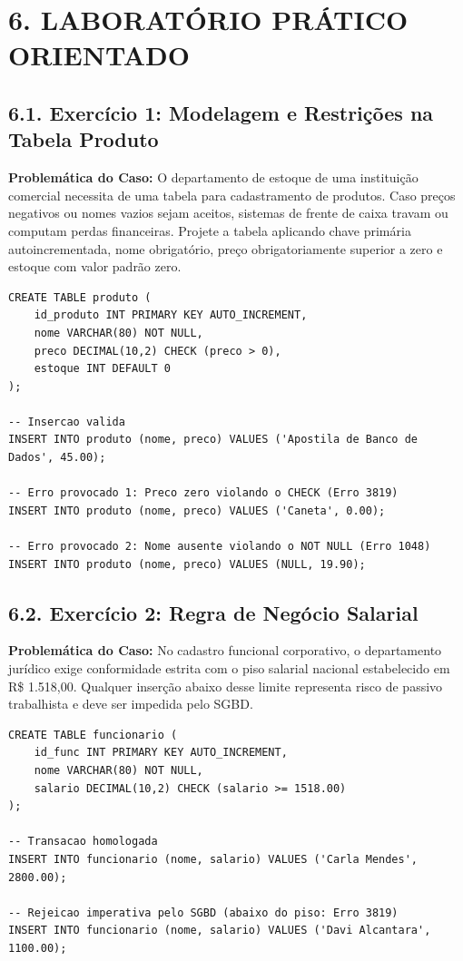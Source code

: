 \newpage

\section*{6. LABORATÓRIO PRÁTICO ORIENTADO}

\subsection*{6.1. Exercício 1: Modelagem e Restrições na Tabela Produto}

\textbf{Problemática do Caso:} O departamento de estoque de uma instituição comercial necessita de uma tabela para cadastramento de produtos. Caso preços negativos ou nomes vazios sejam aceitos, sistemas de frente de caixa travam ou computam perdas financeiras. Projete a tabela aplicando chave primária autoincrementada, nome obrigatório, preço obrigatoriamente superior a zero e estoque com valor padrão zero.

\begin{lstlisting}
CREATE TABLE produto (
    id_produto INT PRIMARY KEY AUTO_INCREMENT,
    nome VARCHAR(80) NOT NULL,
    preco DECIMAL(10,2) CHECK (preco > 0),
    estoque INT DEFAULT 0
);

-- Insercao valida
INSERT INTO produto (nome, preco) VALUES ('Apostila de Banco de Dados', 45.00);

-- Erro provocado 1: Preco zero violando o CHECK (Erro 3819)
INSERT INTO produto (nome, preco) VALUES ('Caneta', 0.00);

-- Erro provocado 2: Nome ausente violando o NOT NULL (Erro 1048)
INSERT INTO produto (nome, preco) VALUES (NULL, 19.90);
\end{lstlisting}

\subsection*{6.2. Exercício 2: Regra de Negócio Salarial}

\textbf{Problemática do Caso:} No cadastro funcional corporativo, o departamento jurídico exige conformidade estrita com o piso salarial nacional estabelecido em R\$ 1.518,00. Qualquer inserção abaixo desse limite representa risco de passivo trabalhista e deve ser impedida pelo SGBD.

\begin{lstlisting}
CREATE TABLE funcionario (
    id_func INT PRIMARY KEY AUTO_INCREMENT,
    nome VARCHAR(80) NOT NULL,
    salario DECIMAL(10,2) CHECK (salario >= 1518.00)
);

-- Transacao homologada
INSERT INTO funcionario (nome, salario) VALUES ('Carla Mendes', 2800.00);

-- Rejeicao imperativa pelo SGBD (abaixo do piso: Erro 3819)
INSERT INTO funcionario (nome, salario) VALUES ('Davi Alcantara', 1100.00);
\end{lstlisting}

